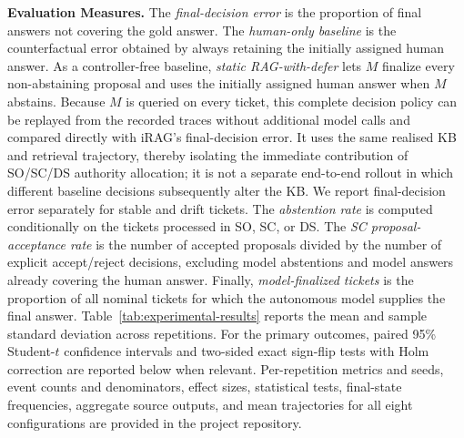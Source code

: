 \documentclass[a4paper,twoside]{article}
\begin{document}
\textbf{Evaluation Measures.}
The \textit{final-decision error} is the proportion of final answers not covering the gold answer. The \textit{human-only baseline} is the counterfactual error obtained by always retaining the initially assigned human answer. As a controller-free baseline, \textit{static RAG-with-defer} lets $M$ finalize every non-abstaining proposal and uses the initially assigned human answer when $M$ abstains. Because $M$ is queried on every ticket, this complete decision policy can be replayed from the recorded traces without additional model calls and compared directly with iRAG's final-decision error. It uses the same realised KB and retrieval trajectory, thereby isolating the immediate contribution of SO/SC/DS authority allocation; it is not a separate end-to-end rollout in which different baseline decisions subsequently alter the KB.
We report final-decision error separately for stable and drift tickets. The \textit{abstention rate} is computed conditionally on the tickets processed in SO, SC, or DS. The \textit{SC proposal-acceptance rate} is the number of accepted proposals divided by the number of explicit accept/reject decisions, excluding model abstentions and model answers already covering the human answer. Finally, \textit{model-finalized tickets} is the proportion of all nominal tickets for which the autonomous model supplies the final answer. 
Table~\ref{tab:experimental-results} reports the mean and sample standard deviation across repetitions. For the primary outcomes, paired 95\% Student-$t$ confidence intervals and two-sided exact sign-flip tests with Holm correction are reported below when relevant. Per-repetition metrics and seeds, event counts and denominators, effect sizes, statistical tests, final-state frequencies, aggregate source outputs, and mean trajectories for all eight configurations are provided in the project repository.
\end{document}
